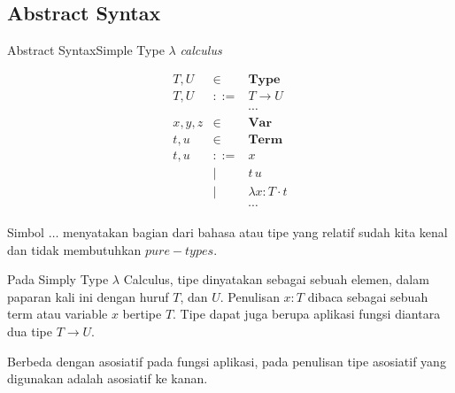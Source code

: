 \documentclass[aspectratio=1610,10pt,handout]{beamer}
\newcommand{\lc}{$\lambda$ {\it calculus}\ }
\begin{document}
\subsection{Abstract Syntax}
\begin{frame}{Abstract Syntax}{Simple Type \lc }

	\[
	\begin{array}{rcl}
	T, U &\in& \mathbf{Type} \\
	T, U &::=& T \to U \\
	&& \cdots\\
	x,y,z &\in& \mathbf{Var} \\
	t,u &\in& \mathbf{Term} \\
	t,u &::=& x \\
	&\mid& t\,u \\
	&\mid& \lambda {x:T}\cdot t \\
	&& \cdots
	\end{array}
	\]

	Simbol $\dots$ menyatakan bagian dari bahasa atau tipe yang relatif sudah kita
	kenal dan tidak membutuhkan $pure-types$.

	Pada Simply Type $\lambda$ Calculus, tipe dinyatakan sebagai sebuah elemen, dalam paparan kali ini dengan huruf $T$, dan $U$. Penulisan $x:T$ dibaca sebagai sebuah term atau variable $x$ bertipe $T$. Tipe dapat juga berupa aplikasi fungsi diantara dua tipe $T \to U$.

	Berbeda dengan asosiatif pada fungsi aplikasi, pada penulisan tipe asosiatif yang digunakan adalah asosiatif ke kanan.

\end{frame}
\end{document}
